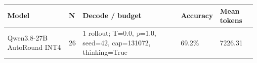 \begin{tabular}{lllll}
\hline
Model & N & Decode / budget & Accuracy & Mean tokens \\
\hline
Qwen3.8-27B AutoRound INT4 & 26 & 1 rollout; T=0.0, p=1.0, seed=42, cap=131072, thinking=True & 69.2\% & 7226.31 \\
\hline
\end{tabular}
